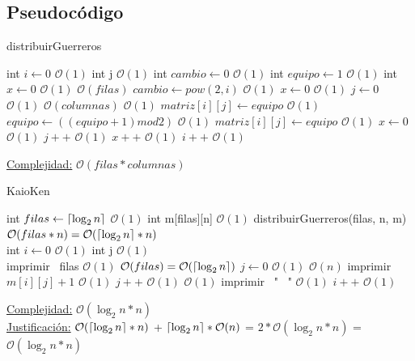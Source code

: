 \subsection{Pseudocódigo}

\begin{algorithm}
\caption{distribuirGuerreros}
\begin{algorithmic}
	\State int $i \gets 0$ \Comment $\mathcal{O}(1)$
	\State int j \Comment $\mathcal{O}(1)$
	\State int $cambio \gets 0$ \Comment $\mathcal{O}(1)$
	\State int $equipo \gets 1$ \Comment $\mathcal{O}(1)$
	\State int $x \gets 0$ \Comment $\mathcal{O}(1)$
	 \Comment $\mathcal{O}(filas)$
		\State $cambio \gets pow(2,i)$ \Comment $\mathcal{O}(1)$
		\State $x \gets 0$ \Comment $\mathcal{O}(1)$
		\State $j \gets 0$ \Comment $\mathcal{O}(1)$
		 \Comment $\mathcal{O}(columnas)$
			 \Comment $\mathcal{O}(1)$
				\State $matriz[i][j] \gets equipo$ \Comment $\mathcal{O}(1)$
			\Else
				\State $equipo \gets ((equipo +1) mod 2)$ \Comment $\mathcal{O}(1)$
				\State $matriz[i][j] \gets equipo$ \Comment $\mathcal{O}(1)$
				\State $x \gets 0$ \Comment $\mathcal{O}(1)$
			\EndIf
			\State $j++$ \Comment $\mathcal{O}(1)$
			\State $x++$ \Comment $\mathcal{O}(1)$
		\EndWhile
		\State $i++$ \Comment $\mathcal{O}(1)$
	\EndWhile
\EndFunction
\end{algorithmic}
\underline{Complejidad:} $\mathcal{O}(filas*columnas)$\\
\end{algorithm}


\begin{algorithm}
\caption{KaioKen}
\begin{algorithmic}
	\State int $filas \gets \ceil*{\log_2 n}$ \Comment $\mathcal{O}(1)$
	\State int m[filas][n] \Comment $\mathcal{O}(1)$
	\State distribuirGuerreros(filas, n, m) \Comment $\mathcal{O}(filas*n) = \mathcal{O}(\ceil*{\log_2 n}*n)$
	\\
	\State int $i \gets 0$ \Comment $\mathcal{O}(1)$
	\State int j \Comment $\mathcal{O}(1)$
	\\
	\State imprimir ~filas \Comment $\mathcal{O}(1)$
	 \Comment $\mathcal{O}(filas) = \mathcal{O}(\ceil*{\log_2 n})$
		\State $j \gets 0$ \Comment $\mathcal{O}(1)$
		 \Comment $\mathcal{O}(n)$
			\State imprimir ~$m[i][j]+1$ \Comment $\mathcal{O}(1)$
			\State $j++$ \Comment $\mathcal{O}(1)$
			 \Comment $\mathcal{O}(1)$
				\State imprimir ~"~ " \Comment $\mathcal{O}(1)$
			\EndIf
		\EndWhile
		\State $i++$ \Comment $\mathcal{O}(1)$
	\EndWhile
\EndFunction
\end{algorithmic}
\underline{Complejidad:} $\mathcal{O}(\log _{2} n * n)$\\
    \underline{Justificación:} $ \mathcal{O}(\ceil*{\log_2 n}*n)$ + $ \ceil*{\log_2 n} * \mathcal{O}(n)$ = $2*\mathcal{O}(\log _{2} n * n)$ = $\mathcal{O}(\log _{2} n * n)$\\
\end{algorithm}

